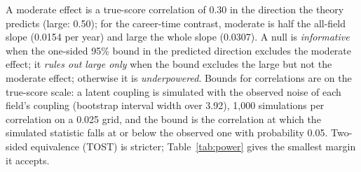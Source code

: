 \documentclass[11pt]{article}
\begin{document}
A moderate effect is a true-score correlation of 0.30 in the direction the theory predicts (large: 0.50); for the career-time
contrast, moderate is half the all-field slope (0.0154 per year) and large the whole slope (0.0307). A null is \emph{informative} when
the one-sided 95\% bound in the predicted direction excludes the moderate effect; it \emph{rules out large only} when the bound excludes
the large but not the moderate effect; otherwise it is \emph{underpowered}. Bounds for correlations are on the true-score scale: a
latent coupling is simulated with the observed noise of each field's coupling (bootstrap interval width over 3.92), 1,000 simulations per
correlation on a 0.025 grid, and the bound is the correlation at which the simulated statistic falls at or below the observed one with
probability 0.05. Two-sided equivalence (TOST) is stricter; Table~\ref{tab:power} gives the smallest margin it accepts.
\end{document}
